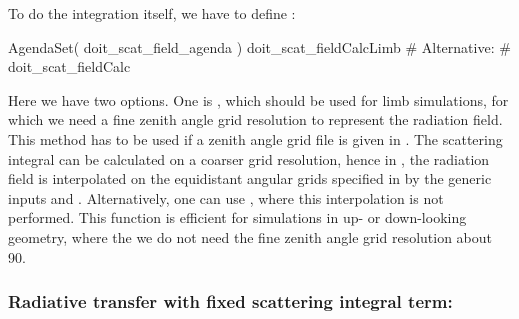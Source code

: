 To do the integration itself, we have to define
:
\begin{code}
AgendaSet( doit_scat_field_agenda ){
 doit_scat_fieldCalcLimb
 # Alternative: 
 # doit_scat_fieldCalc
}
\end{code}
Here we have two options. One is ,
which should be used for limb simulations, for which we need a fine
zenith angle grid resolution to represent the radiation field. This
method has to be used if a zenith angle grid file is given in
. The
scattering integral can be calculated on a coarser grid resolution, hence
in , the radiation field is
interpolated on the equidistant angular grids specified in
 by the generic inputs  and
. Alternatively, one can use 
, where this interpolation is not 
performed. This function is efficient for simulations in up- or
down-looking geometry, where the we do not need the fine zenith angle
grid resolution about 90\degree. 

\subsubsection{Radiative transfer with fixed scattering integral term:}

